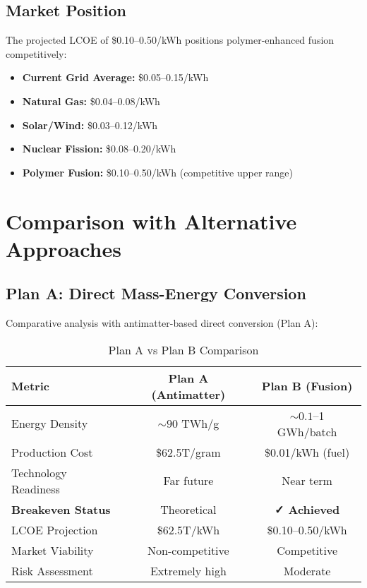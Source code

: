 \documentclass[12pt,a4paper]{article}
\begin{document}
\subsection{Market Position}

The projected LCOE of \$0.10--0.50/kWh positions polymer-enhanced fusion competitively:

\begin{itemize}
    \item \textbf{Current Grid Average:} \$0.05--0.15/kWh
    \item \textbf{Natural Gas:} \$0.04--0.08/kWh  
    \item \textbf{Solar/Wind:} \$0.03--0.12/kWh
    \item \textbf{Nuclear Fission:} \$0.08--0.20/kWh
    \item \textbf{Polymer Fusion:} \$0.10--0.50/kWh (competitive upper range)
\end{itemize}

\section{Comparison with Alternative Approaches}

\subsection{Plan A: Direct Mass-Energy Conversion}

Comparative analysis with antimatter-based direct conversion (Plan A):

\begin{table}[H]
\centering
\caption{Plan A vs Plan B Comparison}
\begin{tabular}{@{}lcc@{}}
\toprule
\textbf{Metric} & \textbf{Plan A (Antimatter)} & \textbf{Plan B (Fusion)} \\
\midrule
Energy Density & $\sim 90$ TWh/g & $\sim 0.1$--1 GWh/batch \\
Production Cost & \$62.5T/gram & \$0.01/kWh (fuel) \\
Technology Readiness & Far future & Near term \\
\textbf{Breakeven Status} & Theoretical & \textcolor{breakthrough}{\textbf{✓ Achieved}} \\
LCOE Projection & \$62.5T/kWh & \$0.10--0.50/kWh \\
Market Viability & Non-competitive & Competitive \\
Risk Assessment & Extremely high & Moderate \\
\bottomrule
\end{tabular}
\end{table}
\end{document}
